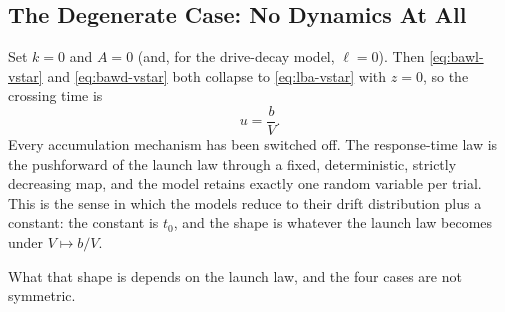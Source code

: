 \documentclass[12pt]{article}
\theoremstyle{remark}
\begin{document}
\subsection{The Degenerate Case: No Dynamics At All}
Set $k = 0$ and $A = 0$ (and, for the drive-decay model, $\ell = 0$). Then
\eqref{eq:bawl-vstar} and \eqref{eq:bawd-vstar} both collapse to
\eqref{eq:lba-vstar} with $z = 0$, so the crossing time is
\begin{equation}
  u = \frac{b}{V}.
  \label{eq:degenerate}
\end{equation}
Every accumulation mechanism has been switched off. The response-time law is the pushforward of the launch law through a fixed, deterministic, strictly decreasing map, and the model retains exactly one random variable per trial. This is the sense in which the models reduce to their drift distribution plus a constant: the constant is $t_0$, and the shape is whatever the launch law becomes under $V \mapsto b/V$.

What that shape is depends on the launch law, and the four cases are not symmetric.
\end{document}
